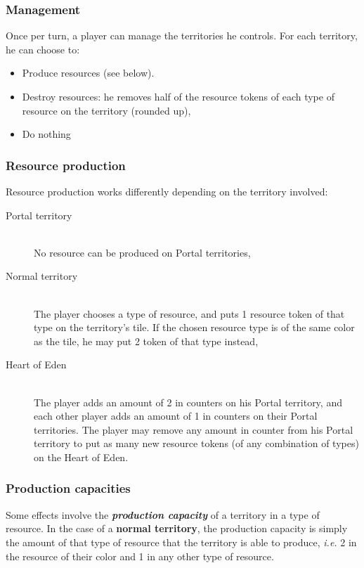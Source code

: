\documentclass[a4paper]{article}
\begin{document}
    \subsubsection{Management}
    \vspace{-1em}
    Once per turn, a player can manage the territories he controls.
    For each territory, he can choose to:
    \vspace{-1.3em}
    \begin{itemize}
        \item Produce resources (see below).
        \item Destroy resources: he removes half of the resource
        tokens of each type of resource on the territory (rounded up),
        \item Do nothing
    \end{itemize}
  
    \subsubsection{Resource production}
    \vspace{-1em}
      \hspace{-2em} Resource production works differently depending on the
      territory involved:
      \vspace{-1.3em}
      \begin{description}
          \item[Portal territory] \hfill \\
          No resource can be produced on Portal territories,
          \item[Normal territory] \hfill \\
          The player chooses a type of resource, and puts 1 resource token of that
          type on the territory's tile.
          If the chosen resource type is of the same color as the tile,
          he may put 2 token of that type instead,
          \item[Heart of Eden] \hfill \\
          The player adds an amount of 2 in counters on his Portal territory, and
          each other player adds an amount of 1 in counters on their Portal territories.
          The player may remove any amount in counter from his Portal territory to put
          as many new resource tokens (of any combination of types) on the Heart of Eden.
      \end{description}
  
    \subsubsection{Production capacities}
      \vspace{-1em}
      Some effects involve the \textbf{\textit{production capacity}} of
      a territory in a type of resource.
      In the case of a \textbf{normal territory}, the production capacity is simply
      the amount of that type of resource that the territory is able to produce,
      \textit{i.e.} 2 in the resource of their color and 1 in any other type of resource.
      
\end{document}
